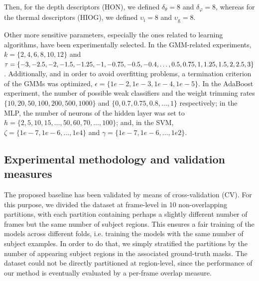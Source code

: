 \documentclass[10pt,twocolumn,letterpaper]{article}
\begin{document}
Then, for the depth descriptors (HON), we defined $\delta_\theta = 8$ and $\delta_\varphi = 8$, whereas for the thermal descriptors (HIOG), we defined $\upsilon_{\mathrm{i}} = 8$ and $\upsilon_{\mathrm{g}} = 8$. 


Other more sensitive parameters, especially the ones related to learning algorithms, have been experimentally selected. In the GMM-related experiments, $k = \{2,4,6,8,10,12\}$ and $\tau = \{-3, -2.5, -2, -1.5, -1.25, -1, -0.75, -0.5, -0.4, \ldots, \linebreak 0.5, 0.75, 1, 1.25, 1.5, 2, 2.5, 3\}$. Additionally, and in order to avoid overfitting problems, a termination criterion of the GMMs was optimized, $\epsilon = \{1e-2, 1e-3, 1e-4, 1e-5\}$. In the AdaBoost experiment, the number of possible weak classifiers and the weight trimming rates $\{10, 20, 50, 100, 200, 500, 1000\}$ and $\{0, 0.7, 0.75, 0.8, \ldots, 1\}$ respectively; in the MLP, the number of neurons of the hidden layer was set to $h = \{2, 5, 10, 15, \ldots, 50, 60, 70, \ldots, 100\}$; and, in the SVM, $\zeta = \{1e-7, 1e-6, \ldots, 1e4\}$ and $\gamma = \{1e-7, 1e-6, \ldots, 1e2\}$.



\subsection{Experimental methodology and validation measures}
\label{ssec:validation}

The proposed baseline has been validated by means of cross-validation (CV). For this purpose, we divided the dataset at frame-level in 10 non-overlapping partitions, with each partition containing perhaps a slightly different number of frames but the same number of subject regions. This ensures a fair training of the models across different folds, i.e. training the models with the same number of subject examples. In order to do that, we simply stratified the partitions by the number of appearing subject regions in the associated ground-truth masks. The dataset could not be directly partitioned at region-level, since the performance of our method is eventually evaluated by a per-frame overlap measure.
\end{document}
